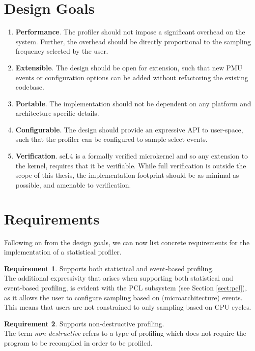 \section{Design Goals}

\ssp\begin{enumerate}
    \item \textbf{Performance}. The profiler should not impose a significant overhead on the system. Further, the overhead should be directly proportional to the sampling frequency selected by the user.
    \item \textbf{Extensible}. The design should be open for extension, such that new PMU events or configuration options can be added without refactoring the existing codebase. 
    \item \textbf{Portable}. The implementation should not be dependent on any platform and architecture specific details.
    \item \textbf{Configurable}. The design should provide an expressive API to user-space, such that the profiler can be configured to sample select events. 
    \item \textbf{Verification}. seL4 is a formally verified microkernel and so any extension to the kernel, requires that it be verifiable. While full verification is outside the scope of this thesis, the implementation footprint should be as minimal as possible, and amenable to verification.
\end{enumerate}\dsp

\section{Requirements}

Following on from the design goals, we can now list concrete requirements for the implementation of a statistical profiler.

\textbf{Requirement 1}. Supports both statistical and event-based profiling.\\
The additional expressivity that arises when supporting both statistical and event-based profiling, is evident with the PCL subsystem (see Section \ref{sect:pcl}), as it allows the user to configure sampling based on (microarchitecture) events. This means that users are not constrained to only sampling based on CPU cycles.

\textbf{Requirement 2}. Supports non-destructive profiling.\\
The term \textit{non-destructive} refers to a type of profiling which does not require the program to be recompiled in order to be profiled. 

